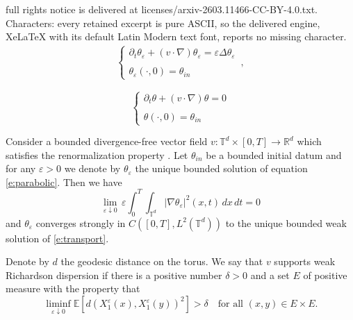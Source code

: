 \documentclass[10pt,a4paper]{amsart}
\begin{document}
full rights notice is delivered at licenses/arxiv-2603.11466-CC-BY-4.0.txt. Characters: every retained excerpt is pure ASCII, so the delivered engine, XeLaTeX with its default Latin Modern text font, reports no missing character.
\begin{align}\label{e:parabolic}
\left\{
\begin{array}{ll}
\partial_t \theta_\varepsilon + (v\cdot \nabla) \theta_\varepsilon = \varepsilon \Delta \theta_\varepsilon\\ \\
\theta_\varepsilon (\cdot, 0) = \theta_{in}
\end{array}
\right.\, ,
\end{align}

\begin{equation}\label{e:transport}
\left\{
\begin{array}{ll}
\partial_t \theta + (v\cdot \nabla )\theta = 0 \\ \\
\theta (\cdot, 0) = \theta_{in}
\end{array}
\right.
\end{equation}

\begin{theorem}\label{p:no-dissipation}
Consider a bounded divergence-free vector field $v: \mathbb T^d \times [0,T] \to \mathbb R^d$ which satisfies the renormalization property . Let $\theta_{in}$ be a bounded initial datum and for any $\varepsilon>0$ we denote by $\theta_\varepsilon$ the unique bounded solution of equation \eqref{e:parabolic}. Then we have
\begin{equation}\label{e:no-dissipation}
\lim_{\varepsilon \downarrow 0}\, \varepsilon \int_0^T \int_{\mathbb T^d} |\nabla \theta_\varepsilon|^2 (x,t)\, dx\, dt = 0
\end{equation}
and $\theta_\varepsilon$ converges strongly in $C([0,T], L^2 (\mathbb{T}^d))$ to the unique bounded weak solution of \eqref{e:transport}.
\end{theorem}

\begin{definition}\label{d:Richardson-dispersion}
Denote by $d$ the geodesic distance on the torus. We say that $v$ supports  weak Richardson dispersion if there is a positive number $\delta > 0$ and a set $E$ of positive measure with the property that
\[
\liminf_{\varepsilon\downarrow 0} \mathbb E[ d (X_1^\varepsilon (x), X_1^\varepsilon (y))^2] > \delta \quad\mbox{for all $(x,y) \in E\times E$.}
\]
\end{definition}
\end{document}
